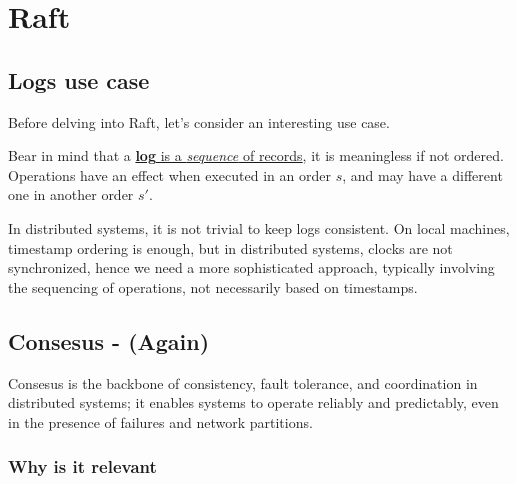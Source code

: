 \chapter{Raft}


\section{Logs use case}
Before delving into Raft, let's consider an interesting use case. 

Bear in mind that a \ul{\textbf{log} is a \textit{sequence} of records}, it is meaningless if not ordered.
Operations have an effect when executed in an order $s$, and may have a different one in another order $s'$.

In distributed systems, it is not trivial to keep logs consistent.
On local machines, timestamp ordering is enough, but in distributed systems, clocks are not synchronized, hence we need a more sophisticated approach, typically involving the sequencing of operations, not necessarily based on timestamps.

\section{Consesus - (Again)}
Consesus is the backbone of consistency, fault tolerance, and coordination in distributed systems;
it enables systems to operate reliably and predictably, even in the presence of failures and network partitions.

\subsection{Why is it relevant}


